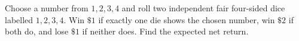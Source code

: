 Choose a number from $1,2,3,4$ and roll two independent fair four-sided dice labelled $1,2,3,4$. Win $\$1$ if exactly one die shows the chosen number, win $\$2$ if both do, and lose $\$1$ if neither does. Find the expected net return.
